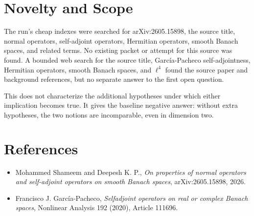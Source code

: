 \documentclass[11pt]{article}
\begin{document}
\section*{Novelty and Scope}

The run's cheap indexes were searched for arXiv:2605.15898, the source title,
normal operators, self-adjoint operators, Hermitian operators, smooth Banach
spaces, and related terms.  No existing packet or attempt for this source was
found.  A bounded web search for the source title, García-Pacheco
self-adjointness, Hermitian operators, smooth Banach spaces, and \(\ell^4\)
found the source paper and background references, but no separate answer to
the first open question.

This does not characterize the additional hypotheses under which either
implication becomes true.  It gives the baseline negative answer: without
extra hypotheses, the two notions are incomparable, even in dimension two.

\section*{References}

\begin{itemize}
\item Mohammed Shameem and Deepesh K. P.,
\emph{On properties of normal operators and self-adjoint operators on smooth
Banach spaces}, arXiv:2605.15898, 2026.
\item Francisco J. García-Pacheco,
\emph{Selfadjoint operators on real or complex Banach spaces},
Nonlinear Analysis 192 (2020), Article 111696.
\end{itemize}
\end{document}
